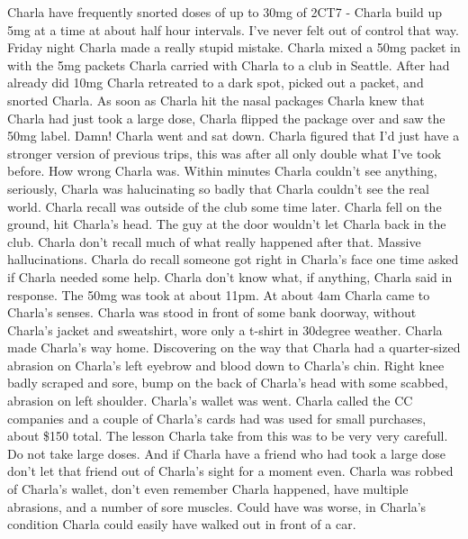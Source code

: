 \documentclass[12pt]{book}
\begin{document}
Charla have frequently snorted doses of up to 30mg of 2CT7 - Charla build up 5mg at a time at about half hour intervals. I've never felt out of control that way. Friday night Charla made a really stupid mistake. Charla mixed a 50mg packet in with the 5mg packets Charla carried with Charla to a club in Seattle. After had already did 10mg Charla retreated to a dark spot, picked out a packet, and snorted Charla. As soon as Charla hit the nasal packages Charla knew that Charla had just took a large dose, Charla flipped the package over and saw the 50mg label. Damn! Charla went and sat down. Charla figured that I'd just have a stronger version of previous trips, this was after all only double what I've took before. How wrong Charla was. Within minutes Charla couldn't see anything, seriously, Charla was halucinating so badly that Charla couldn't see the real world. Charla recall was outside of the club some time later. Charla fell on the ground, hit Charla's head. The guy at the door wouldn't let Charla back in the club. Charla don't recall much of what really happened after that. Massive hallucinations. Charla do recall someone got right in Charla's face one time asked if Charla needed some help. Charla don't know what, if anything, Charla said in response. The 50mg was took at about 11pm. At about 4am Charla came to Charla's senses. Charla was stood in front of some bank doorway, without Charla's jacket and sweatshirt, wore only a t-shirt in 30degree weather. Charla made Charla's way home. Discovering on the way that Charla had a quarter-sized abrasion on Charla's left eyebrow and blood down to Charla's chin. Right knee badly scraped and sore, bump on the back of Charla's head with some scabbed, abrasion on left shoulder. Charla's wallet was went. Charla called the CC companies and a couple of Charla's cards had was used for small purchases, about \$150 total. The lesson Charla take from this was to be very very carefull. Do not take large doses. And if Charla have a friend who had took a large dose don't let that friend out of Charla's sight for a moment even. Charla was robbed of Charla's wallet, don't even remember Charla happened, have multiple abrasions, and a number of sore muscles. Could have was worse, in Charla's condition Charla could easily have walked out in front of a car.
\end{document}
